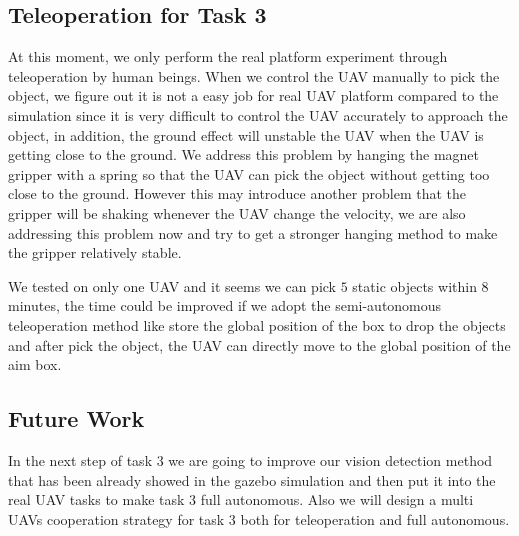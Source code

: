 \documentclass{standalone}
\begin{document}
\subsection{Teleoperation for Task 3}
At this moment, we only perform the real platform experiment through teleoperation by human beings. When we control the UAV manually to pick the object, we figure out it is not a easy job for real UAV platform compared to the simulation since it is very difficult to control the UAV accurately to approach the object, in addition, the ground effect will unstable the UAV when the UAV is getting close to the ground. We address this problem by hanging the magnet gripper with a spring so that the UAV can pick the object without getting too close to the ground. However this may introduce another problem that the gripper will be shaking whenever the UAV change the velocity, we are also addressing this problem now and try to get a stronger hanging method to make the gripper relatively stable.

We tested on only one UAV and it seems we can pick $5$ static objects within $8$ minutes, the time could be improved if we adopt the semi-autonomous teleoperation method like store the global position of the box to drop the objects and after pick the object, the UAV can directly move to the global position of the aim box.

\subsection{Future Work}
In the next step of task 3 we are going to improve our vision detection method that has been already showed in the gazebo simulation and then put it into the real UAV tasks to make task 3 full autonomous. Also we will design a multi UAVs cooperation strategy for task 3 both for teleoperation and full autonomous.
\end{document}
